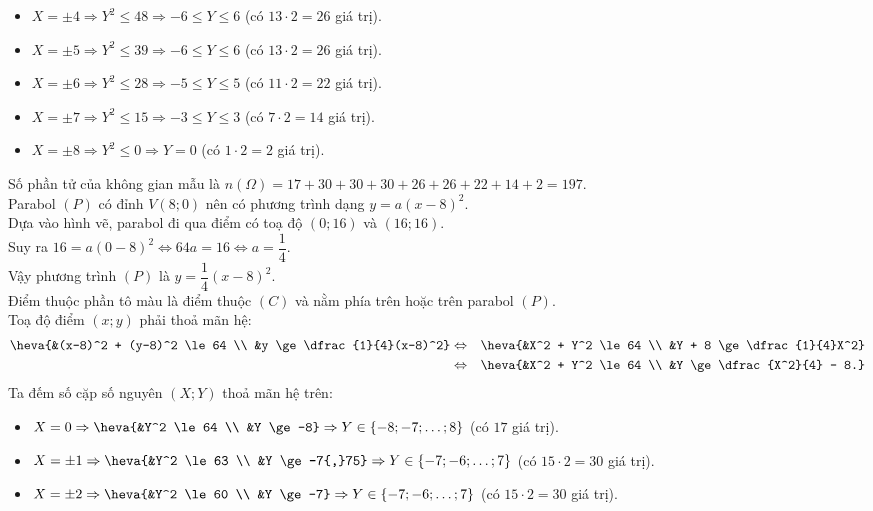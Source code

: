 \begin{ex}
{\begin{itemize}
			\item $X = \pm 4 \Rightarrow Y^2 \le 48 \Rightarrow -6 \le Y \le 6$ (có $13 \cdot 2 = 26$ giá trị).
			\item $X = \pm 5 \Rightarrow Y^2 \le 39 \Rightarrow -6 \le Y \le 6$ (có $13 \cdot 2 = 26$ giá trị).
			\item $X = \pm 6 \Rightarrow Y^2 \le 28 \Rightarrow -5 \le Y \le 5$ (có $11 \cdot 2 = 22$ giá trị).
			\item $X = \pm 7 \Rightarrow Y^2 \le 15 \Rightarrow -3 \le Y \le 3$ (có $7 \cdot 2 = 14$ giá trị).
			\item $X = \pm 8 \Rightarrow Y^2 \le 0 \Rightarrow Y = 0$ (có $1 \cdot 2 = 2$ giá trị).
		\end{itemize}
		Số phần tử của không gian mẫu là $n(\Omega) = 17 + 30 + 30 + 30 + 26 + 26 + 22 + 14 + 2 = 197$.\\
		Parabol $(P)$ có đỉnh $V(8;0)$ nên có phương trình dạng $y = a(x-8)^2$.\\
		Dựa vào hình vẽ, parabol đi qua điểm có toạ độ $(0;16)$ và $(16;16)$.\\
		Suy ra $16 = a(0-8)^2 \Leftrightarrow 64a = 16 \Leftrightarrow a = \dfrac{1}{4}$.\\
		Vậy phương trình $(P)$ là $y = \dfrac{1}{4}(x-8)^2$.\\
		Điểm thuộc phần tô màu là điểm thuộc $(C)$ và nằm phía trên hoặc trên parabol $(P)$.\\
		Toạ độ điểm $(x;y)$ phải thoả mãn hệ:
		\begin{eqnarray*} 
			\heva{&(x-8)^2 + (y-8)^2 \le 64 \\ &y \ge \dfrac{1}{4}(x-8)^2} &\Leftrightarrow& \heva{&X^2 + Y^2 \le 64 \\ &Y + 8 \ge \dfrac{1}{4}X^2} \\ 
			&\Leftrightarrow& \heva{&X^2 + Y^2 \le 64 \\ &Y \ge \dfrac{X^2}{4} - 8.} 
		\end{eqnarray*}
		Ta đếm số cặp số nguyên $(X;Y)$ thoả mãn hệ trên:
		\begin{itemize}
			\item $X = 0 \Rightarrow \heva{&Y^2 \le 64 \\ &Y \ge -8} \Rightarrow Y \in \{-8; -7; \dots; 8\}$ (có $17$ giá trị).
			\item $X = \pm 1 \Rightarrow \heva{&Y^2 \le 63 \\ &Y \ge -7{,}75} \Rightarrow Y \in \{-7; -6; \dots; 7\}$ (có $15 \cdot 2 = 30$ giá trị).
			\item $X = \pm 2 \Rightarrow \heva{&Y^2 \le 60 \\ &Y \ge -7} \Rightarrow Y \in \{-7; -6; \dots; 7\}$ (có $15 \cdot 2 = 30$ giá trị).

\end{itemize}}
\end{ex}
